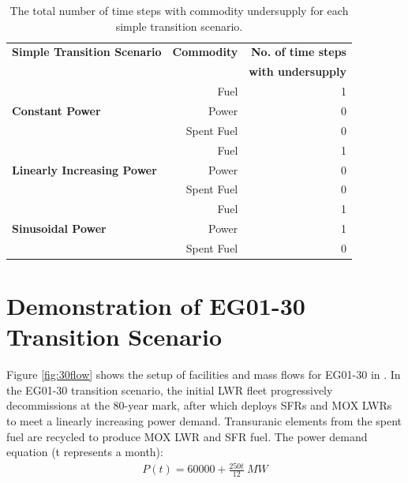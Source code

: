     \begin{table}[]
        \centering
        \doublespacing
        \caption {The total number of time steps with commodity undersupply 
        for each simple transition scenario. }
        \label{tab:transition-scenario-results}
            \small
            \begin{tabular}{l|rr}	
                \hline
                \textbf{Simple Transition Scenario}    & \textbf{Commodity}    & \textbf{No. of time steps} \\ 
                && \textbf{with undersupply} \\ \hline
                \multirow{3}{*}{\textbf{Constant Power}} & Fuel & 1 \\ 
                                                         & Power & 0 \\ 
                                                         & Spent Fuel & 0 \\ \hline
                \multirow{3}{*}{\textbf{Linearly Increasing Power}} & Fuel & 1 \\ 
                                                         & Power & 0 \\ 
                                                         & Spent Fuel & 0 \\ \hline
                \multirow{3}{*}{\textbf{Sinusoidal Power}} & Fuel & 1 \\ 
                                                         & Power & 1 \\ 
                                                         & Spent Fuel & 0 \\ \hline
                \end{tabular}
    \end{table}

\section{\deploy Demonstration of EG01-30 Transition Scenario} 
\label{sec:eg01-30}
Figure \ref{fig:30flow} shows the setup of facilities and mass flows 
for EG01-30 in \Cyclus. 
In the EG01-30 transition scenario, the initial LWR fleet 
progressively decommissions at the 80-year mark,
after which \deploy deploys \glspl{SFR} and \gls{MOX} \glspl{LWR} to 
meet a linearly increasing power demand. 
Transuranic elements from the spent fuel are recycled to 
produce \gls{MOX} \gls{LWR} and \gls{SFR} fuel. 
The power demand equation (t represents a month): 
\begin{align}
    P(t) = 60000 + \frac{250t}{12}\ MW
\end{align}

